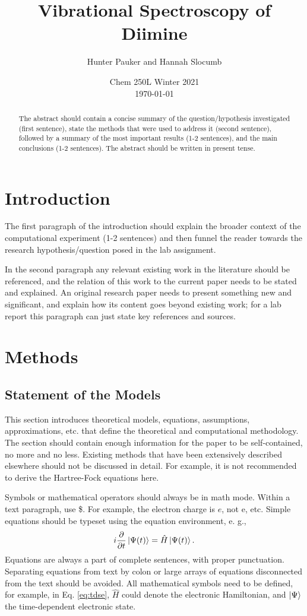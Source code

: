 \documentclass[11pt]{article}
\title{\textbf{Vibrational Spectroscopy of Diimine}}
\author{Hunter Pauker and Hannah Slocumb}
\date{Chem 250L Winter 2021 \\ \today}
\begin{document}
\maketitle

\begin{abstract}
  \noindent The abstract should contain a concise summary of the
  question/hypothesis investigated (first sentence), state the methods
  that were used to address it (second sentence), followed by a summary
  of the most important results (1-2 sentences), and the main
  conclusions (1-2 sentences). The abstract should be written in present
  tense.
\end{abstract}

\section{Introduction}

The first paragraph of the introduction should explain the broader
context of the computational experiment (1-2 sentences) and then
funnel the reader towards the research hypothesis/question posed in the
lab assignment.

In the second paragraph any relevant existing work in the literature should
be referenced, and the relation of this work to the current paper needs
to be stated and explained. An original research paper needs to present
something new and significant, and explain how its content goes beyond
existing work; for a lab report this paragraph can just state key
references and sources.

\section{Methods}

\subsection{Statement of the Models}

This section introduces theoretical models, equations, assumptions,
approximations, etc. that define the theoretical and computational
methodology. The section should contain enough information for the paper
to be self-contained, no more and no less. Existing methods
that have been extensively described elsewhere should not be discussed
in detail. For example, it is not recommended to derive the Hartree-Fock
equations here.

Symbols or mathematical operators should always be in math mode. Within
a text paragraph, use \$. For example, the electron charge is $e$, not
e, etc. Simple equations should be typeset using the equation
environment, e. g.,
\begin{equation}
  \label{eq:tdse}
  i \frac{ \partial}{\partial t} \ket{\Psi(t)} = \hat{H} \ket{\Psi(t)}.
\end{equation}
Equations are always a part of complete sentences, with proper
punctuation. Separating equations from text by colon or large arrays of
equations disconnected from the text should be avoided. All mathematical
symbols need to be defined, for example, in Eq. \eqref{eq:tdse},
$\hat{H}$ could denote the electronic Hamiltonian, and $\ket{\Psi}$ the
time-dependent electronic state.
\end{document}
